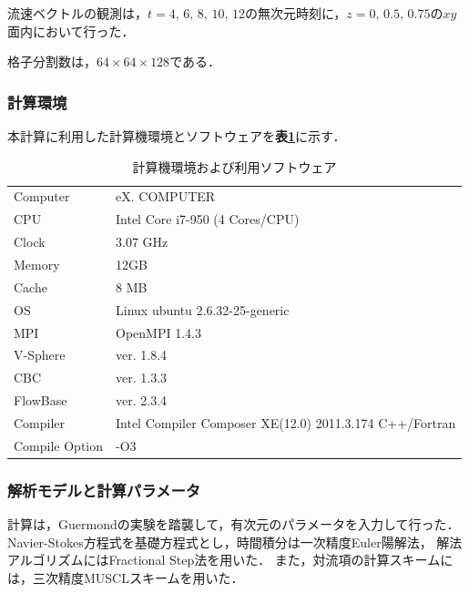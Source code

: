 流速ベクトルの観測は，$t = 4, \, 6, \,8, \,10, \,12$の無次元時刻に，$z = 0, \,0.5, \,0.75$の$xy$面内において行った．

格子分割数は，$64\times 64 \times 128$である．

\subsubsection{計算環境}
本計算に利用した計算機環境とソフトウェアを\textbf{表\ref{tbl: LDC112 env}}に示す．

\begin{table}[htdp]
\small
\caption{計算機環境および利用ソフトウェア}
\begin{center}
\begin{tabular}{ll}\toprule
Computer & eX. COMPUTER\\
CPU & Intel Core i7-950 (4 Cores/CPU)\\
Clock & 3.07 GHz\\
Memory & 12GB \\
Cache & 8 MB\\
OS & Linux ubuntu 2.6.32-25-generic\\ \hline
MPI & OpenMPI 1.4.3\\
V-Sphere & ver. 1.8.4\\
CBC & ver. 1.3.3\\
FlowBase & ver. 2.3.4\\ \hline
Compiler & Intel Compiler Composer XE(12.0) 2011.3.174 C++/Fortran\\
Compile Option & -O3\\
\bottomrule
\end{tabular}
\end{center}
\label{tbl: LDC112 env}
\end{table}

\subsubsection{解析モデルと計算パラメータ}
計算は，Guermondの実験を踏襲して，有次元のパラメータを入力して行った．
Navier-Stokes方程式を基礎方程式とし，時間積分は一次精度Euler陽解法，
解法アルゴリズムにはFractional Step法を用いた．
また，対流項の計算スキームには，三次精度MUSCLスキームを用いた．

